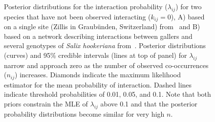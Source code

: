 \documentclass[12pt]{article}
\begin{document}
  \begin{figure}[h!]
    \caption{Posterior distributions for the interaction probability ($\lambda_{ij}$) for two species that have not been observed interacting ($k_{ij}=0$), A) based on a single site (Zillis in Graub\"{u}nden, Switzerland) from~\citet{Kopelke2017} and B) based on a network describing interactions between gallers and several genotypes of \emph{Salix hookeriana} from~\citet{Barbour2016}. Posterior distributions (curves) and 95\% credible intervals (lines at top of panel) for $\lambda_{ij}$ narrow and approach zero as the number of observed co-occurrences ($n_{ij}$) increases. Diamonds indicate the maximum likelihood estimator for the mean probability of interaction.
    Dashed lines indicate threshold probabilities of 0.01, 0.05, and 0.1. Note that both priors constrain the MLE of $\lambda_{ij}$ above 0.1 and that the posterior probability distributions become similar for very high $n$.}
    \label{prior_comparison}
    \begin{center}
    \end{center}
    \end{figure}




\clearpage

     
\end{document}
